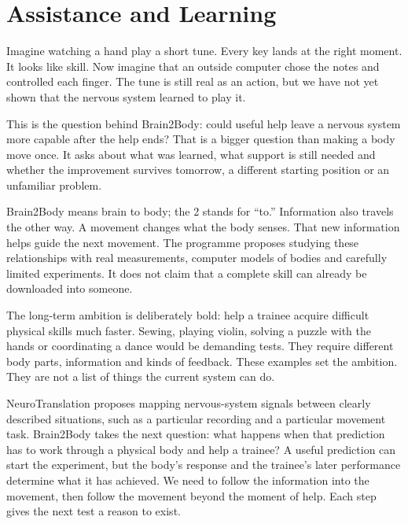 

\section{Assistance and Learning}

Imagine watching a hand play a short tune. Every key lands at the right moment. It looks like skill. Now imagine that an outside computer chose the notes and controlled each finger. The tune is still real as an action, but we have not yet shown that the nervous system learned to play it.\par

This is the question behind Brain2Body: could useful help leave a nervous system more capable after the help ends? That is a bigger question than making a body move once. It asks about what was learned, what support is still needed and whether the improvement survives tomorrow, a different starting position or an unfamiliar problem.\par

Brain2Body means brain to body; the 2 stands for ``to.'' Information also travels the other way. A movement changes what the body senses. That new information helps guide the next movement. The programme proposes studying these relationships with real measurements, computer models of bodies and carefully limited experiments. It does not claim that a complete skill can already be downloaded into someone.\par

The long-term ambition is deliberately bold: help a trainee acquire difficult physical skills much faster. Sewing, playing violin, solving a puzzle with the hands or coordinating a dance would be demanding tests. They require different body parts, information and kinds of feedback. These examples set the ambition. They are not a list of things the current system can do.\par

NeuroTranslation proposes mapping nervous-system signals between clearly described situations, such as a particular recording and a particular movement task. Brain2Body takes the next question: what happens when that prediction has to work through a physical body and help a trainee? A useful prediction can start the experiment, but the body's response and the trainee's later performance determine what it has achieved. We need to follow the information into the movement, then follow the movement beyond the moment of help. Each step gives the next test a reason to exist.\par

